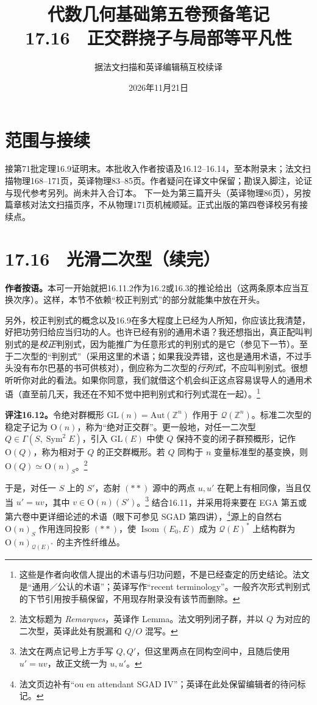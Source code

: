 \documentclass[openany,fontset=fandol]{ctexbook}
\newcommand{\Qsp}{\mathcal Q}
\DeclareMathOperator{\Sym}{Sym}
\DeclareMathOperator{\Isom}{Isom}
\begin{document}
\title{代数几何基础第五卷预备笔记\\17.16　正交群挠子与局部等平凡性}
\author{据法文扫描和英译编辑稿互校续译}
\date{2026年11月21日}
\maketitle
\chapter*{范围与接续}
接第71批定理16.9证明末。本批收入作者按语及16.12--16.14，至本附录末；法文扫描物理168--171页，英译物理83--85页。作者疑问在译文中保留；勘误入脚注，论证与现代参考另列。尚未并入合订本。
下一处为第三篇开头（英译物理86页），另按篇章核对法文扫描页序，不从物理171页机械顺延。正式出版的第四卷译校另有接续点。

\chapter*{17.16　光滑二次型（续完）}
\noindent\textbf{作者按语。}\quad 本可一开始就把16.11.2作为16.2或16.3的推论给出（这两条原本应当互换次序）。这样，本节不依赖“校正判别式”的部分就能集中放在开头。

另外，校正判别式的概念以及16.9在多大程度上已经为人所知，你应该比我清楚，好把功劳归给应当归功的人。也许已经有别的通用术语？我还想指出，真正配叫判别式的是\emph{校正}判别式，因为能推广为任意形式的判别式的是它（参见下一节）。至于二次型的“判别式”（采用这里的术语；如果我没弄错，这也是通用术语，不过手头没有布尔巴基的书可供核对），倒应称为二次型的\emph{行列式}，不应叫判别式。很想听听你对此的看法。如果你同意，我们就借这个机会纠正这点容易误导人的通用术语（直至前几天，我还在不知不觉中把判别式和行列式混在一起）。\footnote{这些是作者向收信人提出的术语与归功问题，不是已经查定的历史结论。法文是“通用／公认的术语”；英译写作“recent terminology”。一般齐次形式判别式的下节引用按手稿保留，不用现存附录没有该节而删除。}

\medskip
\noindent\textbf{评注16.12。}\quad 令绝对群概形 $\mathrm{GL}(n)=\mathrm{Aut}(\mathbb Z^n)$ 作用于 $\Qsp(\mathbb Z^n)$。标准二次型的稳定子记为 $\mathrm O(n)$，称为“绝对正交群”。更一般地，对任一二次型 $Q\in\Gamma(S,\Sym^2E)$，引入 $\mathrm{GL}(E)$ 中使 $Q$ 保持不变的闭子群预概形，记作 $\mathrm O(Q)$，称为相对于 $Q$ 的正交群概形。若 $Q$ 同构于 $n$ 变量标准型的基变换，则 $\mathrm O(Q)\simeq\mathrm O(n)_S$。\footnote{法文标题为 \emph{Remarques}，英译作 Lemma。法文明列闭子群，并以 $Q$ 为对应的二次型，英译此处有脱漏和 $Q/O$ 混写。}

于是，对任一 $S$ 上的 $S'$，态射 $(**)$ 源中的两点 $u,u'$ 在靶上有相同像，当且仅当 $u'=uv$，其中 $v\in\mathrm O(n)(S')$。\footnote{法文在两点记号上方手写 $Q,Q'$，但这里两点在同构空间中，且随后使用 $u'=uv$，故正文统一为 $u,u'$。}
结合16.11，并采用将来要在 EGA 第五或第六卷中更详细论述的术语（眼下可参见 SGAD 第四讲），\footnote{法文页边补有“ou en attendant SGAD IV”；英译在此处保留编辑者的待问标记。}源上的自然右 $\mathrm O(n)_S$ 作用连同投影 $(**)$，使 $\Isom(E_0,E)$ 成为 $\Qsp(E)^*$ 上结构群为 $\mathrm O(n)_{\Qsp(E)^*}$ 的主齐性纤维丛。
\end{document}
